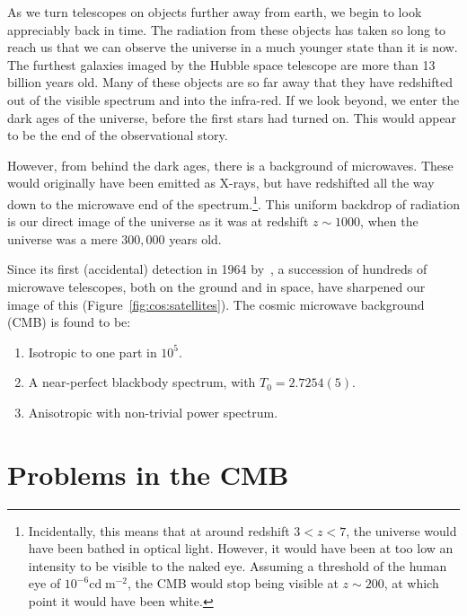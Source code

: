 As we turn telescopes on objects further away from earth, we begin to look appreciably back in time. The radiation from these objects has taken so long to reach us that we can observe the universe in a much younger state than it is now. The furthest galaxies imaged by the Hubble space telescope are more than 13 billion years old. Many of these objects are so far away that they have redshifted out of the visible spectrum and into the infra-red. If we look beyond, we enter the dark ages of the universe, before the first stars had turned on. This would appear to be the end of the observational story.

However, from behind the dark ages, there is a background of microwaves. These would originally have been emitted as X-rays, but have redshifted all the way down to the microwave end of the spectrum.\footnote{Incidentally, this means that at around redshift $3<z<7$, the universe would have been bathed in optical light. However, it would have been at too low an intensity to be visible to the naked eye. Assuming a threshold of the human eye of $10^{-6}\mathrm{cd}\;\mathrm{m}^{-2}$, the CMB would stop being visible at $z\sim200$, at which point it would have been white.}. This uniform backdrop of radiation is our direct image of the universe as it was at redshift $z\sim1000$, when the universe was a mere $300,000$ years old.

Since its first (accidental) detection in 1964 by~\cite{PenziasWilson}, a succession of hundreds of microwave telescopes, both on the ground and in space, have sharpened our image of this (Figure~\ref{fig:cos:satellites}).
The cosmic microwave background (CMB) is found to be:
\begin{enumerate}
  \item Isotropic to one part in $10^{5}$.
  \item A near-perfect blackbody spectrum, with $T_0=2.7254(5)$.
  \item Anisotropic with non-trivial power spectrum.
\end{enumerate}

\section{Problems in the CMB}
